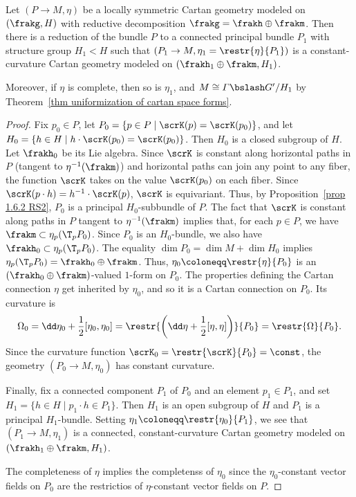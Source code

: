 \begin{prop}
    Let $(P\to M,\eta)$ be a locally symmetric Cartan geometry modeled on $(\frakg,H)$ with reductive decomposition $\frakg=\frakh\oplus\frakm$. Then there is a reduction of the bundle $P$ to a connected principal bundle $P_1$ with structure group $H_1<H$ such that $(P_1\to M,\eta_1=\restr{\eta}{P_1})$ is a constant-curvature Cartan geometry modeled on $(\frakh_1\oplus\frakm,H_1)$. 
    
    Moreover, if $\eta$ is complete, then so is $\eta_1$, and $M\cong \varGamma\bslash G'\slash H_1$ by Theorem~\ref{thm uniformization of cartan space forms}.
\end{prop}
\begin{proof}
    Fix $p_0\in P$, let $P_0=\{p\in P\mid \scrK(p)=\scrK(p_0)\}$, and let $H_0=\{h\in H\mid h\cdot \scrK(p_0)=\scrK(p_0)\}$. Then $H_0$ is a closed subgroup of $H$. Let $\frakh_0$ be its Lie algebra. Since $\scrK$ is constant along horizontal paths in $P$ (tangent to $\eta^{-1}(\frakm)$) and horizontal paths can join any point to any fiber, the function $\scrK$ takes on the value $\scrK(p_0)$ on each fiber. Since $\scrK(p\cdot h)=h^{-1}\cdot \scrK(p)$, $\scrK$ is equivariant. Thus, by Proposition~\ref{prop 1.6.2 RS2}, $P_0$ is a principal $H_0$-subbundle of $P$. The fact that $\scrK$ is constant along paths in $P$ tangent to $\eta^{-1}(\frakm)$ implies that, for each $p\in P$, we have $\frakm\subset \eta_p(\T_p P_0)$. Since $P_0$ is an $H_0$-bundle, we also have $\frakh_0\subset \eta_p(\T_p P_0)$. The equality $\dim P_0=\dim M+\dim H_0$ implies $\eta_p(\T_p P_0)=\frakh_0\oplus\frakm$. Thus, $\eta_0\coloneqq \restr{\eta}{P_0}$ is an $(\frakh_0\oplus \frakm)$-valued $1$-form on $P_0$. The properties defining the Cartan connection $\eta$ get inherited by $\eta_0$, and so it is a Cartan connection on $P_0$. Its curvature is 
    \[\Omega_0=\dd \eta_0+\frac12[\eta_0,\eta_0]=\restr{\left(\dd\eta+\frac12[\eta,\eta]\right)}{P_0}=\restr{\Omega}{P_0}.\]
    Since the curvature function $\scrK_0=\restr{\scrK}{P_0}=\const$, the geometry $(P_0\to M,\eta_0)$ has constant curvature.

    Finally, fix a connected component $P_1$ of $P_0$ and an element $p_1\in P_1$, and set $H_1=\{h\in H\mid p_1\cdot h\in P_1\}$. Then $H_1$ is an open subgroup of $H$ and $P_1$ is a principal $H_1$-bundle. Setting $\eta_1\coloneqq\restr{\eta_0}{P_1}$, we see that $(P_1\to M,\eta_1)$ is a connected, constant-curvature Cartan geometry modeled on $(\frakh_1\oplus\frakm,H_1)$.

    The completeness of $\eta$ implies the completenss of $\eta_0$ since the $\eta_0$-constant vector fields on $P_0$ are the restrictios of $\eta$-constant vector fields on $P$.
\end{proof}







